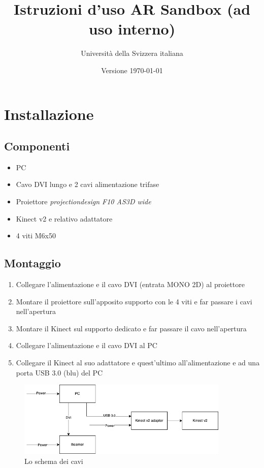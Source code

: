 \documentclass[12pt]{article}
\title{Istruzioni d'uso AR Sandbox (ad uso interno)}
\author{Università della Svizzera italiana}
\date{Versione \today}
\begin{document}
\maketitle
\tableofcontents
\newpage


\section{Installazione}\label{installation}

\subsection{Componenti}

\begin{itemize}
	\item PC
	\item Cavo DVI lungo e 2 cavi alimentazione trifase
	\item Proiettore \textit{projectiondesign F10 AS3D wide}
	\item Kinect v2 e relativo adattatore
	\item 4 viti M6x50
\end{itemize}


\subsection{Montaggio}

\begin{enumerate}
	\item Collegare l'alimentazione e il cavo DVI (entrata MONO 2D) al proiettore
	\item Montare il proiettore sull'apposito supporto con le 4 viti e far passare i cavi
	      nell'apertura
	\item Montare il Kinect sul supporto dedicato e far passare il cavo nell'apertura
	\item Collegare l'alimentazione e il cavo DVI al PC
	\item Collegare il Kinect al suo adattatore e quest'ultimo all'alimentazione e ad una porta USB 3.0 (blu) del PC
\end{enumerate}

\begin{figure}[H]
	\centering
	\includegraphics[width=0.9\textwidth]{img/cablesScheme.png}
	\caption*{Lo schema dei cavi}
\end{figure}
\end{document}
